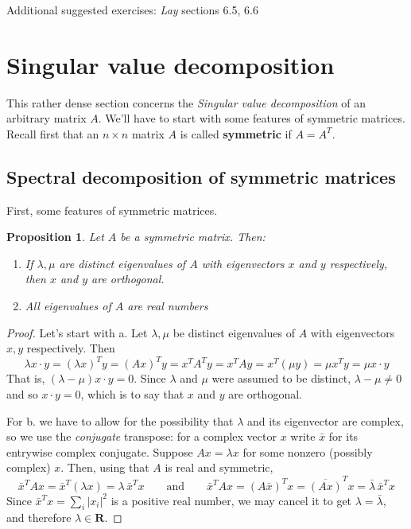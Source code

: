 \documentclass[12pt]{article}
\numberwithin{equation}{subsection}
\numberwithin{figure}{subsection}
\newtheorem{prop}[subsection]{Proposition}
\theoremstyle{note}
\newcommand{\R}{\mathbf{R}}
\begin{document}
Additional suggested exercises: \textit{Lay} sections 6.5, 6.6


\section{Singular value decomposition}
This rather dense section concerns the \textit{Singular value decomposition} of an arbitrary matrix $A$. We'll have to start with some features of symmetric matrices. Recall first that  an $n\times n$ matrix $A$ is called \textbf{symmetric} if $A=A^T$. 

\subsection{Spectral decomposition of symmetric matrices}
First, some features of symmetric matrices.
\begin{prop}
	Let  $A$ be a symmetric matrix.  Then:
	\begin{enumerate}
	\item If $\lambda, \mu$ are \textit{distinct} eigenvalues of $A$ with eigenvectors $x$ and $y$ respectively, then $x$ and $y$ are orthogonal. 
	\item All eigenvalues of $A$ are real numbers
	\end{enumerate}
	
\end{prop}
\begin{proof}
	Let's start with a. Let $\lambda,\mu$ be distinct eigenvalues of $A$ with eigenvectors $x,y$ respectively. Then \begin{equation} \lambda x\cdot y= (\lambda x)^T y=(Ax)^Ty=x^TA^Ty=x^TAy=x^T(\mu y)=\mu x^Ty=\mu x\cdot y\end{equation} That is, $(\lambda- \mu)x\cdot y=0$. Since $\lambda$ and $\mu$ were assumed to be distinct, $\lambda-\mu\neq 0$ and so $x\cdot y=0$, which is to say that $x$ and $y$ are orthogonal. 

	For b. we have to allow for the possibility that $\lambda$ and its eigenvector are complex, so we use the \textit{conjugate} transpose: for a complex vector $x$ write $\bar{x}$ for its entrywise complex conjugate. Suppose $Ax=\lambda x$ for some nonzero (possibly complex) $x$. Then, using that $A$ is real and symmetric, \[ \bar{x}^TAx = \bar{x}^T(\lambda x)=\lambda\, \bar{x}^Tx \qquad \text{and} \qquad \bar{x}^TAx=(A\bar{x})^Tx=\overline{(Ax)}^Tx=\bar{\lambda}\,\bar{x}^Tx\] Since $\bar{x}^Tx=\sum_i |x_i|^2$ is a positive real number, we may cancel it to get $\lambda=\bar\lambda$, and therefore $\lambda\in \R$.\end{proof}
\end{document}
